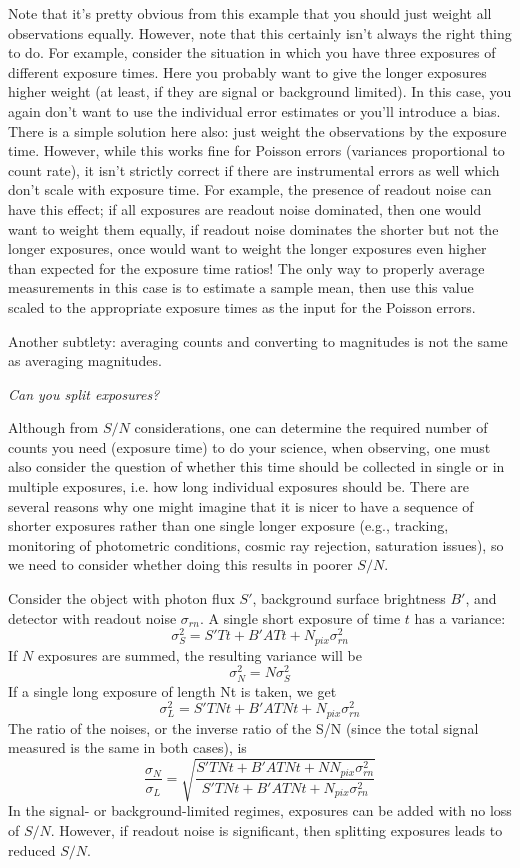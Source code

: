 \documentclass[12pt]{article}
\begin{document}
Note that it's pretty obvious from this example that you should just
weight all observations equally. However, note that this certainly
isn't always the right thing to do. For example, consider the
situation in which you have three exposures of different exposure
times. Here you probably want to give the longer exposures higher
weight (at least, if they are signal or background limited). In this
case, you again don't want to use the individual error estimates or
you'll introduce a bias. There is a simple solution here also: just
weight the observations by the exposure time. However, while this
works fine for Poisson errors (variances proportional to count rate),
it isn't strictly correct if there are instrumental errors as well
which don't scale with exposure time. For example, the presence of
readout noise can have this effect; if all exposures are readout
noise dominated, then one would want to weight them equally, if
readout noise dominates the shorter but not the longer exposures,
once would want to weight the longer exposures even higher than
expected for the exposure time ratios! The only way to properly
average measurements in this case is to estimate a sample mean, then
use this value scaled to the appropriate exposure times as the input
for the Poisson errors.

Another subtlety: averaging counts and converting to magnitudes is
not the same as averaging magnitudes.

\emph{Can you split exposures?}

Although from $S/N$ considerations, one can determine the required
number of counts you need (exposure time) to do your science, when
observing, one must also consider the question of whether this time
should be collected in single or in multiple exposures, i.e. how long
individual exposures should be. There are several reasons why one
might imagine that it is nicer to have a sequence of shorter
exposures rather than one single longer exposure (e.g., tracking,
monitoring of photometric conditions, cosmic ray rejection,
saturation issues), so we need to consider whether doing this results
in poorer $S/N$.

Consider the object with photon flux $S'$,
background surface brightness $B'$, and detector
with readout noise $\sigma_{rn}$. A single short exposure of
time $t$ has a variance:
    $$ \sigma_S^2 = S'Tt + B'ATt + N_{pix}\sigma_{rn}^2 $$
If $N$ exposures are summed, the resulting variance will be
    $$ \sigma_N^2 = N\sigma_S^2 $$
If a single long exposure of length Nt is taken, we get 
    $$ \sigma_L^2 = S'TNt + B'ATNt + N_{pix}\sigma_{rn}^2 $$
The ratio of the noises, or the inverse ratio of the S/N (since the
total signal measured is the same in both cases), is
    $$ \frac{\sigma_N}{\sigma_L} = \sqrt{\frac
    {S'TNt + B'ATNt + NN_{pix}\sigma_{rn}^2 }
    {S'TNt + B'ATNt + N_{pix}\sigma_{rn}^2}
    }$$
In the signal- or background-limited regimes, exposures can be added
with no loss of $S/N$. However, if readout noise is significant, then
splitting exposures leads to reduced $S/N$.
\end{document}

